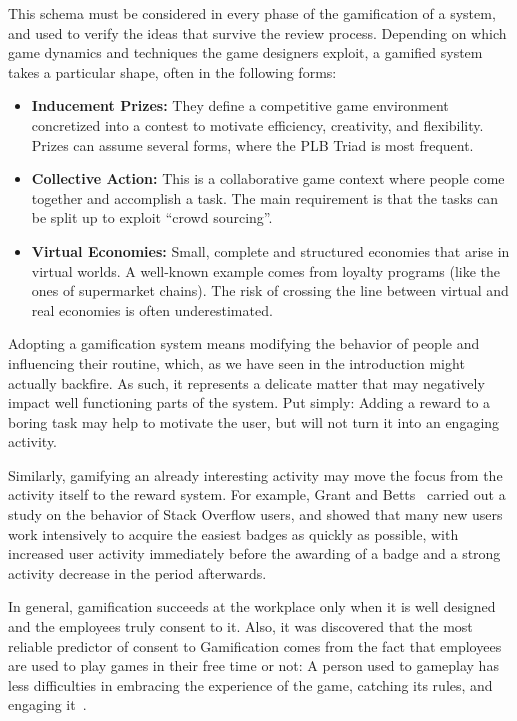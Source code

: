 This schema must be considered in every phase of the gamification of a system, and used to verify the ideas that survive the review process.
Depending on which game dynamics and techniques the game designers exploit, a gamified system takes a particular shape, often in the following forms:
\begin{itemize}
\item \textbf{Inducement Prizes:} They define a competitive game environment concretized into a contest to motivate efficiency, creativity, and flexibility.
Prizes can assume several forms, where the PLB Triad is most frequent.
\item \textbf{Collective Action:} This is a collaborative game context where people come together and accomplish a task.
The main requirement is that the tasks can be split up to exploit ``crowd sourcing''.
\item \textbf{Virtual Economies:} Small, complete and structured economies that arise in virtual worlds.
A well-known example comes from loyalty programs (like the ones of supermarket chains).
The risk of crossing the line between virtual and real economies is often underestimated.
\end{itemize}

Adopting a gamification system means modifying the behavior of people and influencing their routine, which, as we have seen in the introduction might actually backfire.
As such, it represents a delicate matter that may negatively impact well functioning parts of the system.
Put simply: Adding a reward to a boring task may help to motivate the user, but will not turn it into an engaging activity.

Similarly, gamifying an already interesting activity may move the focus from the activity itself to the reward system.
For example, Grant and Betts~\cite{Grant2013} carried out a study on the behavior of Stack Overflow users, and showed that many new users work intensively to acquire the easiest badges as quickly as possible, with increased user activity  immediately before the awarding of a badge and a strong activity decrease in the period afterwards.

In general, gamification succeeds at the workplace only when it is well designed and the employees truly consent to it.
Also, it was discovered that the most reliable predictor of consent to Gamification comes from the fact that employees are used to play games in their free time or not: A person used to gameplay has less difficulties in embracing the experience of the game, catching its rules, and engaging it~\cite{mollick2013mandatory}.

